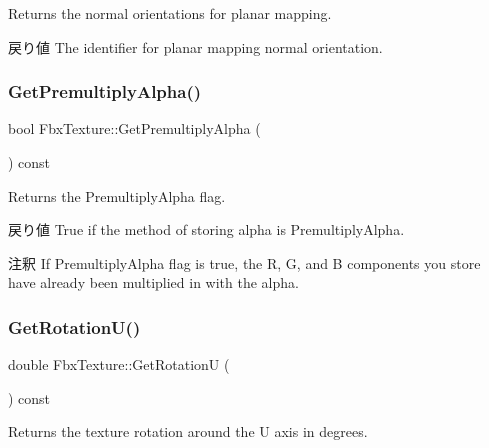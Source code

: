 Returns the normal orientations for planar mapping. \begin{DoxyReturn}{戻り値}
The identifier for planar mapping normal orientation. 
\end{DoxyReturn}
\mbox{\label{class_fbx_texture_a92ffecbc95b53e3b410a2cee81b434dc}} 
\subsubsection{\texorpdfstring{Get\+Premultiply\+Alpha()}{GetPremultiplyAlpha()}}
{\footnotesize\ttfamily bool Fbx\+Texture\+::\+Get\+Premultiply\+Alpha (\begin{DoxyParamCaption}{ }\end{DoxyParamCaption}) const}

Returns the Premultiply\+Alpha flag. \begin{DoxyReturn}{戻り値}
{\ttfamily True} if the method of storing alpha is Premultiply\+Alpha. 
\end{DoxyReturn}
\begin{DoxyRemark}{注釈}
If Premultiply\+Alpha flag is true, the R, G, and B components you store have already been multiplied in with the alpha. 
\end{DoxyRemark}
\mbox{\label{class_fbx_texture_a188819733b0abd2c91050393c036b982}} 
\subsubsection{\texorpdfstring{Get\+Rotation\+U()}{GetRotationU()}}
{\footnotesize\ttfamily double Fbx\+Texture\+::\+Get\+RotationU (\begin{DoxyParamCaption}{ }\end{DoxyParamCaption}) const}



Returns the texture rotation around the U axis in degrees. 

\mbox{\label{class_fbx_texture_a49b00097942d1664a04f39803d083406}} 
